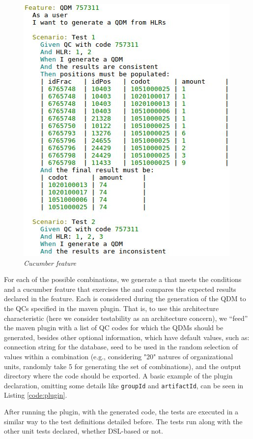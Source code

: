 \begin{figure}[!ht] \centering
  \includegraphics[width=.45\textwidth]
  {img/artigo_cucumber.jpg}
  \caption{\it Cucumber feature}
  \label{fig:cucumber}
\end{figure}

For each of the possible combinations, we generate a \shc that meets the conditions 
and a cucumber feature that exercises the \shc and compares the expected results declared in the feature. 
Each \shc is considered during the generation of the QDM to the QCs specified in the 
maven plugin. That is, to use this architecture characteristic (here we consider testability as an 
architecture concern), we ``feed'' the maven plugin with a list of QC codes for which the QDMs should be generated, 
besides other optional information, which have default values, such as: connection string for the database, 
seed to be used in the random selection of values within a combination (e.g., considering "20" natures of 
organizational units, randomly take 5 for generating the set of combinations), and the output directory 
where the code should be exported. A basic example of the plugin declaration, omitting some details like 
\texttt{groupId} and \texttt{artifactId}, can be seen in Listing \ref{code:plugin}.

After running the plugin, with the generated code, the tests are executed in a similar way to the test 
definitions detailed before. The tests run along with the other unit tests declared, 
whether DSL-based or not.
